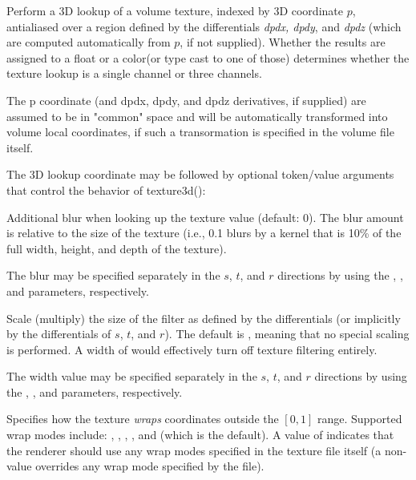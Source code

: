 \documentclass[11pt,letterpaper]{book}
\def\color{{\cf color}\xspace}
\def\float{{\cf float}\xspace}
\def\commonspace{{\cf "common"} space\xspace}
\begin{document}
Perform a 3D lookup of a volume texture, indexed by 3D coordinate
$p$, antialiased over a region defined by the differentials
\emph{dpdx, dpdy}, and \emph{dpdz} (which are computed
automatically from $p$, if not supplied).  Whether the results
are assigned to a \float or a \color (or type cast to one of those)
determines whether the texture lookup is a single channel or three
channels.

The {\cf p} coordinate (and {\cf dpdx}, {\cf dpdy}, and {\cf dpdz}
derivatives, if supplied) are assumed to be in \commonspace and will be
automatically transformed into volume local coordinates, if such a
transormation is specified in the volume file itself.

The 3D lookup coordinate may be followed by optional token/value
arguments that control the behavior of {\cf texture3d()}:

\vspace{12pt}
Additional blur when looking up the texture value (default: 0).  The
blur amount is relative to the size of the texture (i.e., 0.1 blurs by a
kernel that is 10\% of the full width, height, and depth of the texture).

The blur may be specified separately in the $s$, $t$, and $r$ directions by
using the , , and  parameters, respectively.
\apiend
\vspace{-16pt}

\vspace{12pt}
Scale (multiply) the size of the filter as defined by the differentials
(or implicitly by the differentials of $s$, $t$, and $r$).  The default is
{}, meaning that no special scaling is performed.  A width of
{} would effectively turn off texture filtering entirely.

The width value may be specified separately in the $s$, $t$, and $r$
directions by using the , , and  parameters,
respectively.
\apiend
\vspace{-16pt}

\vspace{12pt}

Specifies how the texture \emph{wraps} coordinates outside the $[0,1]$
range.  Supported wrap modes include: , ,
, , and  (which is the default).  A
value of  indicates that the renderer should use any wrap
modes specified in the texture file itself (a non- value
overrides any wrap mode specified by the file).
\end{document}
